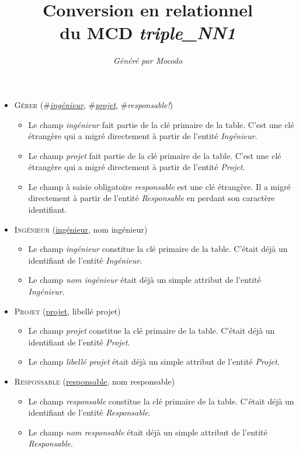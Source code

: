 \documentclass[a4paper]{article}
\title{Conversion en relationnel\\du MCD \emph{triple\_NN1}}
\author{\emph{Généré par Mocodo}}
\newcommand{\relat}[1]{\textsc{#1}}
\newcommand{\attr}[1]{#1}
\newcommand{\prim}[1]{\uline{#1}}
\newcommand{\foreign}[1]{\#\textsl{#1}}
\begin{document}
\maketitle

\begin{itemize}
  \item \relat{Gérer} (\foreign{\prim{ingénieur}}, \foreign{\prim{projet}}, \foreign{responsable!})
  \begin{itemize}
    \item Le champ \emph{ingénieur} fait partie de la clé primaire de la table. C'est une clé étrangère qui a migré directement à partir de l'entité \emph{Ingénieur}.
    \item Le champ \emph{projet} fait partie de la clé primaire de la table. C'est une clé étrangère qui a migré directement à partir de l'entité \emph{Projet}.
    \item Le champ à saisie obligatoire \emph{responsable} est une clé étrangère. Il a migré directement à partir de l'entité \emph{Responsable} en perdant son caractère identifiant.
  \end{itemize}

  \item \relat{Ingénieur} (\prim{ingénieur}, \attr{nom ingénieur})
  \begin{itemize}
    \item Le champ \emph{ingénieur} constitue la clé primaire de la table. C'était déjà un identifiant de l'entité \emph{Ingénieur}.
    \item Le champ \emph{nom ingénieur} était déjà un simple attribut de l'entité \emph{Ingénieur}.
  \end{itemize}

  \item \relat{Projet} (\prim{projet}, \attr{libellé projet})
  \begin{itemize}
    \item Le champ \emph{projet} constitue la clé primaire de la table. C'était déjà un identifiant de l'entité \emph{Projet}.
    \item Le champ \emph{libellé projet} était déjà un simple attribut de l'entité \emph{Projet}.
  \end{itemize}

  \item \relat{Responsable} (\prim{responsable}, \attr{nom responsable})
  \begin{itemize}
    \item Le champ \emph{responsable} constitue la clé primaire de la table. C'était déjà un identifiant de l'entité \emph{Responsable}.
    \item Le champ \emph{nom responsable} était déjà un simple attribut de l'entité \emph{Responsable}.
  \end{itemize}

\end{itemize}
\end{document}
